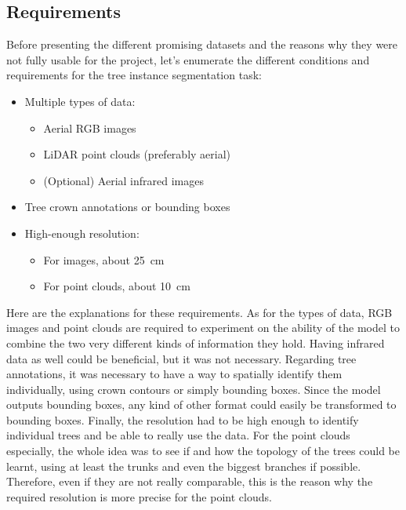 \documentclass[
]{report}
\providecommand{\tightlist}{%
  \setlength{\itemsep}{0pt}\setlength{\parskip}{0pt}}\usepackage{longtable,booktabs,array}
\begin{document}
\subsection{Requirements}\label{requirements}

Before presenting the different promising datasets and the reasons why
they were not fully usable for the project, let's enumerate the
different conditions and requirements for the tree instance segmentation
task:

\begin{itemize}
\tightlist
\item
  Multiple types of data:

  \begin{itemize}
  \tightlist
  \item
    Aerial RGB images
  \item
    LiDAR point clouds (preferably aerial)
  \item
    (Optional) Aerial infrared images
  \end{itemize}
\item
  Tree crown annotations or bounding boxes
\item
  High-enough resolution:

  \begin{itemize}
  \tightlist
  \item
    For images, about 25~cm
  \item
    For point clouds, about 10~cm
  \end{itemize}
\end{itemize}

Here are the explanations for these requirements. As for the types of
data, RGB images and point clouds are required to experiment on the
ability of the model to combine the two very different kinds of
information they hold. Having infrared data as well could be beneficial,
but it was not necessary. Regarding tree annotations, it was necessary
to have a way to spatially identify them individually, using crown
contours or simply bounding boxes. Since the model outputs bounding
boxes, any kind of other format could easily be transformed to bounding
boxes. Finally, the resolution had to be high enough to identify
individual trees and be able to really use the data. For the point
clouds especially, the whole idea was to see if and how the topology of
the trees could be learnt, using at least the trunks and even the
biggest branches if possible. Therefore, even if they are not really
comparable, this is the reason why the required resolution is more
precise for the point clouds.
\end{document}

